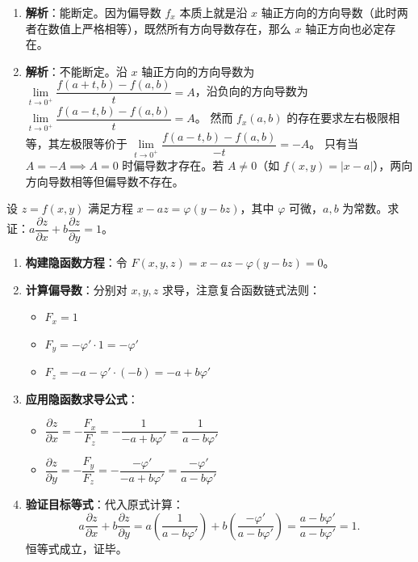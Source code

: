 \documentclass[lang=cn,11pt]{elegantbook}
\begin{document}
\begin{solution}
\begin{enumerate}
  \item \textbf{解析}：能断定。因为偏导数 $f_x$ 本质上就是沿 $x$ 轴正方向的方向导数（此时两者在数值上严格相等），既然所有方向导数存在，那么 $x$ 轴正方向也必定存在。
  \item \textbf{解析}：不能断定。沿 $x$ 轴正方向的方向导数为 $\lim\limits_{t\to 0^+} \dfrac{f(a+t,b)-f(a,b)}{t} = A$，沿负向的方向导数为 $\lim\limits_{t\to 0^+} \dfrac{f(a-t,b)-f(a,b)}{t} = A$。
  然而 $f_x(a,b)$ 的存在要求左右极限相等，其左极限等价于 $\lim\limits_{t\to 0^+} \dfrac{f(a-t,b)-f(a,b)}{-t} = -A$。
  只有当 $A = -A \implies A=0$ 时偏导数才存在。若 $A \neq 0$（如 $f(x,y)=|x-a|$），两向方向导数相等但偏导数不存在。
\end{enumerate}
\end{solution}



\begin{exercise}[隐函数求导公式的验证]
设 $z=f(x,y)$ 满足方程 $x-az=\varphi(y-bz)$，其中 $\varphi$ 可微，$a,b$ 为常数。求证：$a\dfrac{\partial z}{\partial x}+b\dfrac{\partial z}{\partial y}=1$。
\end{exercise}

\begin{solution}
\begin{enumerate}
  \item \textbf{构建隐函数方程}：令 $F(x,y,z) = x - az - \varphi(y-bz) = 0$。
  \item \textbf{计算偏导数}：分别对 $x, y, z$ 求导，注意复合函数链式法则：
  \begin{itemize}
    \item $F_x = 1$
    \item $F_y = -\varphi' \cdot 1 = -\varphi'$
    \item $F_z = -a - \varphi' \cdot (-b) = -a + b\varphi'$
  \end{itemize}
  \item \textbf{应用隐函数求导公式}：
  \begin{itemize}
    \item $\dfrac{\partial z}{\partial x} = -\dfrac{F_x}{F_z} = -\dfrac{1}{-a+b\varphi'} = \dfrac{1}{a-b\varphi'}$
    \item $\dfrac{\partial z}{\partial y} = -\dfrac{F_y}{F_z} = -\dfrac{-\varphi'}{-a+b\varphi'} = \dfrac{-\varphi'}{a-b\varphi'}$
  \end{itemize}
  \item \textbf{验证目标等式}：代入原式计算：
  \[
  a\frac{\partial z}{\partial x} + b\frac{\partial z}{\partial y} = a\left(\frac{1}{a-b\varphi'}\right) + b\left(\frac{-\varphi'}{a-b\varphi'}\right) = \frac{a-b\varphi'}{a-b\varphi'} = 1.
  \]
  恒等式成立，证毕。
\end{enumerate}
\end{solution}
\end{document}
